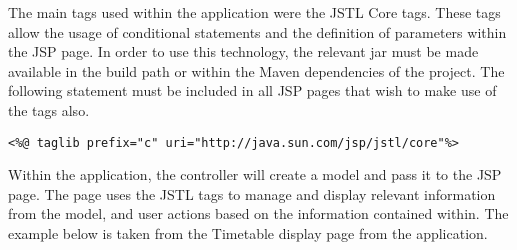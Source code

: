 The main tags used within the application were the JSTL Core tags.  These tags allow the usage of conditional statements and the definition of parameters within the JSP page. In order to use this technology, the relevant jar must be made available in the build path or within the Maven dependencies of the project. The following statement must be included in all JSP pages that wish to make use of the tags also.\newline

\begin{lstlisting}
<%@ taglib prefix="c" uri="http://java.sun.com/jsp/jstl/core"%>
\end{lstlisting}

Within the application, the controller will create a model and pass it to the JSP page. The page uses the JSTL tags to manage and display relevant information from the model, and user actions based on the information contained within. The example below is taken from the Timetable display page from the application.\newline

